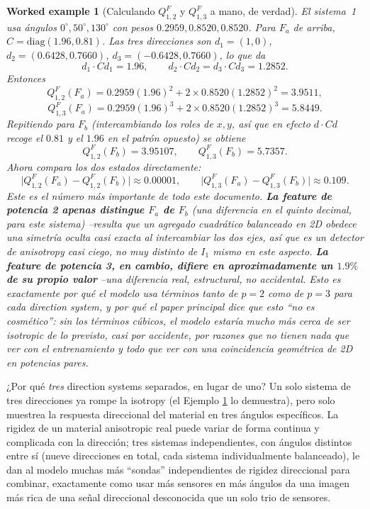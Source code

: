 \documentclass[11pt,a4paper]{article}
\newtheorem{worked}{Worked example}
\begin{document}
\begin{worked}[Calculando $Q^F_{1,2}$ y $Q^F_{1,3}$ a mano, de verdad]
\label{ex:worked-full}
El sistema~1 usa \'angulos $0^\circ,50^\circ,130^\circ$ con pesos
$0.2959,0.8520,0.8520$. Para $F_a$ de arriba, $C=\mathrm{diag}(1.96,0.81)$.
Las tres direcciones son $d_1=(1,0)$, $d_2=(0.6428,0.7660)$,
$d_3=(-0.6428,0.7660)$, lo que da
\[
 d_1\cdot Cd_1=1.96,\qquad d_2\cdot Cd_2=d_3\cdot Cd_3=1.2852 .
\]
Entonces
\[
 Q^F_{1,2}(F_a)=0.2959(1.96)^2+2\times0.8520(1.2852)^2=3.9511,
\]
\[
 Q^F_{1,3}(F_a)=0.2959(1.96)^3+2\times0.8520(1.2852)^3=5.8449.
\]
Repitiendo para $F_b$ (intercambiando los roles de $x,y$, as\'i que en
efecto $d\cdot Cd$ recoge el $0.81$ y el $1.96$ en el patr\'on opuesto)
se obtiene
\[
 Q^F_{1,2}(F_b)=3.95107,\qquad Q^F_{1,3}(F_b)=5.7357.
\]
Ahora compara los dos estados directamente:
\[
 \big|Q^F_{1,2}(F_a)-Q^F_{1,2}(F_b)\big| \approx 0.00001,
 \qquad
 \big|Q^F_{1,3}(F_a)-Q^F_{1,3}(F_b)\big| \approx 0.109 .
\]
Este es el n\'umero m\'as importante de todo este documento.
\textbf{La feature de potencia 2 apenas distingue $F_a$ de $F_b$}
(una diferencia en el quinto decimal, para este sistema) --resulta
que un agregado \emph{cuadr\'atico} balanceado en 2D obedece una
simetr\'ia oculta casi exacta al intercambiar los dos ejes, as\'i que es
un detector de anisotropy casi ciego, no muy distinto de $I_1$ mismo en
este aspecto. \textbf{La feature de potencia 3, en cambio, difiere en
aproximadamente un $1.9\%$ de su propio valor} --una diferencia real,
estructural, no accidental. Esto es exactamente por qu\'e el modelo usa
t\'erminos tanto de $p=2$ como de $p=3$ para cada direction system, y
por qu\'e el paper principal dice que esto ``no es cosm\'etico'': sin
los t\'erminos c\'ubicos, el modelo estar\'ia mucho m\'as cerca de ser
isotropic de lo previsto, casi por accidente, por razones que no tienen
nada que ver con el entrenamiento y todo que ver con una coincidencia
geom\'etrica de 2D en potencias pares.
\end{worked}

¿Por qu\'e \emph{tres} direction systems separados, en lugar de uno?
Un solo sistema de tres direcciones ya rompe la isotropy (el Ejemplo
\ref{ex:worked-full} lo demuestra), pero solo muestrea la respuesta
direccional del material en tres \'angulos espec\'ificos. La rigidez de
un material anisotropic real puede variar de forma continua y
complicada con la direcci\'on; tres sistemas independientes, con
\'angulos distintos entre s\'i (nueve direcciones en total, cada
sistema individualmente balanceado), le dan al modelo muchas m\'as
``sondas'' independientes de rigidez direccional para combinar,
exactamente como usar m\'as sensores en m\'as \'angulos da una imagen
m\'as rica de una se\~nal direccional desconocida que un solo trio de
sensores.
\end{document}
